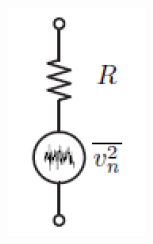 \begin{minipage}[c]{0.15\columnwidth}
    \includegraphics[width=\columnwidth]{images/rauschquelle_spannung.png}
\end{minipage}
\hfill

